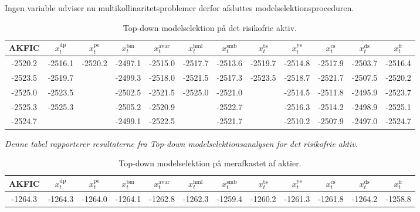 \documentclass[
  a4paper,
  oneside]{memoir}
\begin{document}
Ingen variable udviser nu multikollinaritetsproblemer derfor afsluttes modelselektionsproceduren.

\begin{landscape}
\begin{table}[H]

\caption{\label{tab:STEP-RF-TABLE}Top-down modelselektion på det risikofrie aktiv.}
\centering
\begin{threeparttable}
\begin{tabular}[t]{cccccccccccc}
\toprule
AKFIC & $x_t^{\text{dp}}$ & $x_t^{\text{pe}}$ & $x_t^{\text{bm}}$ & $x_t^{\text{avar}}$ & $x_t^{\text{hml}}$ & $x_t^{\text{smb}}$ & $x_t^{\text{ts}}$ & $x_t^{\text{ys}}$ & $x_t^{\text{cs}}$ & $x_t^{\text{ds}}$ & $x_t^{\text{fr}}$\\
\midrule
\rowcolor{gray!6}  -2520.2 & -2516.1 & -2520.2 & -2497.1 & -2515.0 & -2517.7 & -2513.6 & -2519.7 & -2514.8 & -2517.9 & -2503.7 & -2516.4\\
 
-2523.5 & -2519.7 &  & -2499.3 & -2518.0 & -2521.5 & -2517.3 & -2523.5 & -2518.7 & -2521.7 & -2507.5 & -2520.2\\
 
\rowcolor{gray!6}  -2525.0 & -2523.5 &  & -2502.5 & -2521.5 & -2525.0 & -2521.0 &  & -2514.5 & -2511.8 & -2495.9 & -2523.7\\
 
-2525.3 & -2525.3 &  & -2505.2 & -2520.9 &  & -2522.7 &  & -2516.3 & -2514.2 & -2498.9 & -2525.1\\
 
\rowcolor{gray!6}  -2524.7 &  &  & -2499.1 & -2522.5 &  & -2521.7 &  & -2510.2 & -2507.9 & -2497.0 & -2524.7\\
\bottomrule
\end{tabular}
\begin{tablenotes}
\item \textit{Denne tabel rapporterer resultaterne fra \textit{Top-down} modelselektionsanalysen for det risikofrie aktiv.}
\end{tablenotes}
\end{threeparttable}
\end{table}

\begin{table}[H]

\caption{\label{tab:STEP-AKT-TABLE}Top-down modelselektion på merafkastet af aktier.}
\centering
\begin{threeparttable}
\begin{tabular}[t]{cccccccccccc}
\toprule
AKFIC & $x_t^{\text{dp}}$ & $x_t^{\text{pe}}$ & $x_t^{\text{bm}}$ & $x_t^{\text{avar}}$ & $x_t^{\text{hml}}$ & $x_t^{\text{smb}}$ & $x_t^{\text{ts}}$ & $x_t^{\text{ys}}$ & $x_t^{\text{cs}}$ & $x_t^{\text{ds}}$ & $x_t^{\text{fr}}$\\
\midrule
\rowcolor{gray!6}  -1264.3 & -1264.3 & -1264.0 & -1264.1 & -1262.8 & -1262.3 & -1259.4 & -1260.2 & -1261.3 & -1261.8 & -1264.2 & -1258.8\\
 

\end{tabular}
\end{threeparttable}
\end{table}
\end{landscape}
\end{document}
